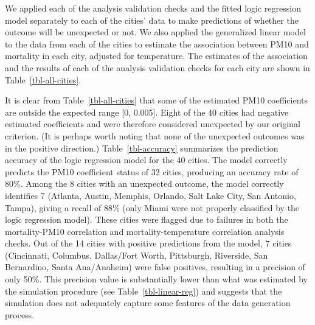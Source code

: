 \documentclass[
  12pt,
]{interact}
\begin{document}
We applied each of the analysis validation checks and the fitted logic
regression model separately to each of the cities' data to make
predictions of whether the outcome will be unexpected or not. We also
applied the generalized linear model to the data from each of the cities
to estimate the association between PM10 and mortality in each city,
adjusted for temperature. The estimates of the association and the
results of each of the analysis validation checks for each city are
shown in Table~\ref{tbl-all-cities}.

\begin{table}

\caption{\label{tbl-accuracy}Summary of the observed and the predicted
unexpected PM10 coefficient results from the 40 NMMAPS cities using the
logic regression model.}


\end{table}%

It is clear from Table~\ref{tbl-all-cities} that some of the estimated
PM10 coefficients are outside the expected range {[}0, 0.005{]}. Eight
of the 40 cities had negative estimated coefficients and were therefore
considered unexpected by our original criterion. (It is perhaps worth
noting that none of the unexpected outcomes was in the positive
direction.) Table~\ref{tbl-accuracy} summarizes the prediction accuracy
of the logic regression model for the 40 cities. The model correctly
predicts the PM10 coefficient status of 32 cities, producing an accuracy
rate of 80\%. Among the 8 cities with an unexpected outcome, the model
correctly identifies 7 (Atlanta, Austin, Memphis, Orlando, Salt Lake
City, San Antonio, Tampa), giving a recall of 88\% (only Miami were not
properly classified by the logic regression model). These cities were
flagged due to failures in both the mortality-PM10 correlation and
mortality-temperature correlation analysis checks. Out of the 14 cities
with positive predictions from the model, 7 cities (Cincinnati,
Columbus, Dallas/Fort Worth, Pittsburgh, Riverside, San Bernardino,
Santa Ana/Anaheim) were false positives, resulting in a precision of
only 50\%. This precision value is substantially lower than what was
estimated by the simulation procedure (see Table~\ref{tbl-linear-reg})
and suggests that the simulation does not adequately capture some
features of the data generation process.
\end{document}
